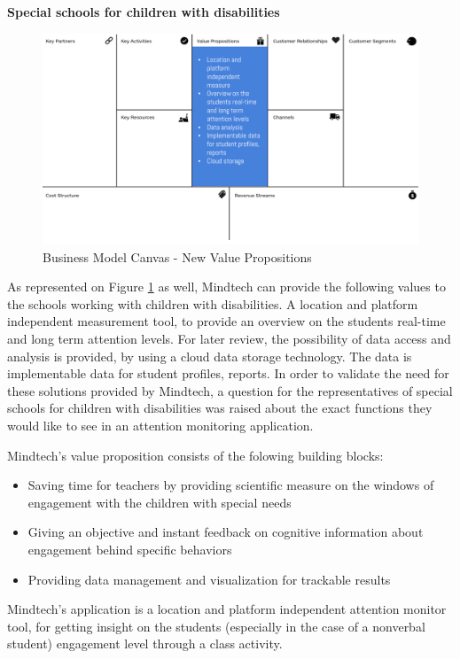 \documentclass[letterpaper,10pt]{article}
\begin{document}
\textbf{Special schools for children with disabilities}

\begin{figure}[!htb]
\centering
\includegraphics[scale=0.5]{valuenew.PNG}
\caption{Business Model Canvas - New Value Propositions}
\label{img:BMC_newvp}
\end{figure}


As represented on Figure \ref{img:BMC_newvp} as well, Mindtech can provide the following values to the schools working with children with disabilities. A location and platform independent measurement tool, to provide an overview on the students real-time and long term attention levels. For later review, the possibility of data access and analysis is provided, by using a cloud data storage technology. The data is implementable data for student profiles, reports.
In order to validate the need for these solutions provided by Mindtech, a question for the representatives of special schools for children with disabilities was raised about the exact functions they would like to see in an attention monitoring application. 

Mindtech's value proposition consists of the folowing building blocks: 
\begin{itemize}
    \item Saving time for teachers by providing scientific measure on the windows of engagement with the children with special needs
    \item Giving an objective and instant feedback on cognitive information about engagement behind specific behaviors
    \item Providing data management and visualization for trackable results
\end{itemize}

Mindtech's application is a location and platform independent attention monitor tool, for getting insight on the students (especially in the case of a nonverbal student) engagement level through a class activity. 
\end{document}
